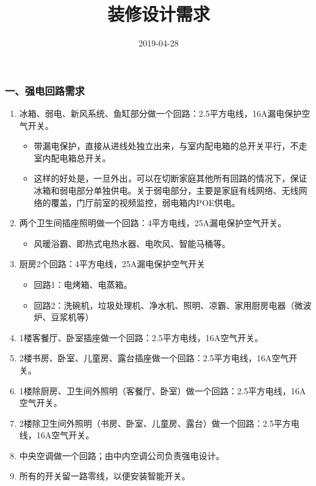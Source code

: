 \documentclass[]{article}
\title{装修设计需求}
\author{}
\date{2019-04-28}
\providecommand{\tightlist}{%
  \setlength{\itemsep}{0pt}\setlength{\parskip}{0pt}}
\begin{document}
\maketitle

\subsubsection{一、强电回路需求}

\begin{enumerate}
\def\labelenumi{\arabic{enumi}.}
\tightlist
\item
  冰箱、弱电、新风系统、鱼缸部分做一个回路：2.5平方电线，16A漏电保护空气开关。

  \begin{itemize}
  \tightlist
  \item
    带漏电保护，直接从进线处独立出来，与室内配电箱的总开关平行，不走室内配电箱总开关。
  \item
    这样的好处是，一旦外出，可以在切断家庭其他所有回路的情况下，保证冰箱和弱电部分单独供电。关于弱电部分，主要是家庭有线网络、无线网络的覆盖，门厅前室的视频监控，弱电箱内POE供电。
  \end{itemize}
\item
  两个卫生间插座照明做一个回路：4平方电线，25A漏电保护空气开关。

  \begin{itemize}
  \tightlist
  \item
    风暖浴霸、即热式电热水器、电吹风、智能马桶等。
  \end{itemize}
\item
  厨房2个回路：4平方电线，25A漏电保护空气开关

  \begin{itemize}
  \tightlist
  \item
    回路1：电烤箱、电蒸箱。
  \item
    回路2：洗碗机，垃圾处理机、净水机、照明、凉霸、家用厨房电器（微波炉、豆浆机等）
  \end{itemize}
\item
  1楼客餐厅、卧室插座做一个回路：2.5平方电线，16A空气开关。
\item
  2楼书房、卧室、儿童房、露台插座做一个回路：2.5平方电线，16A空气开关。
\item
  1楼除厨房、卫生间外照明（客餐厅、卧室）做一个回路：2.5平方电线，16A空气开关。
\item
  2楼除卫生间外照明（书房、卧室、儿童房、露台）做一个回路：2.5平方电线，16A空气开关。
\item
  中央空调做一个回路；由中内空调公司负责强电设计。
\item
  所有的开关留一路零线，以便安装智能开关。
\end{enumerate}
\end{document}
